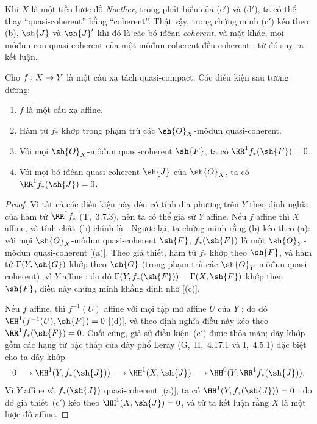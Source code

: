 \documentclass[oneside,10pt]{amsart}
\makeatletter
\newcommand{\ega@arrow}[2]{\mathchoice{#1}{#2}{#2}{#2}}
\renewcommand{\to}{\ega@arrow{\longrightarrow}{\rightarrow}}
\let\EGAOriginalLabel\label
\renewcommand{\label}[1]{\phantomsection\EGAOriginalLabel{#1}}
\makeatother
\begin{document}
\begin{remark}[5.2.1.1]
\label{II.5.2.1.1}
Khi $X$ là một tiền lược đồ \emph{Noether}, trong phát biểu của (c$'$) và (d$'$), ta có thể thay ``quasi-coherent'' bằng ``coherent''.
Thật vậy, trong chứng minh (c$'$) kéo theo (b), $\sh{J}$ và $\sh{J}'$ khi đó là các bó iđêan \emph{coherent}, và mặt khác, mọi môđun con quasi-coherent của một môđun coherent đều coherent ;
từ đó suy ra kết luận.
\end{remark}

\begin{corollary}[5.2.2]
\label{II.5.2.2}
Cho $f:X\to Y$ là một cấu xạ tách quasi-compact.
Các điều kiện sau tương đương:
\begin{enumerate}
  \item[{\rm(a)}] $f$ là một cấu xạ affine.
  \item[{\rm(b)}] Hàm tử $f_*$ khớp trong phạm trù các $\sh{O}_X$-môđun quasi-coherent.
  \item[{\rm(c)}] Với mọi $\sh{O}_X$-môđun quasi-coherent $\sh{F}$, ta có $\RR^1f_*(\sh{F})=0$.
  \item[{\rm(c')}] Với mọi bó iđêan quasi-coherent $\sh{J}$ của $\sh{O}_X$, ta có $\RR^1f_*(\sh{J})=0$.
\end{enumerate}
\end{corollary}

\begin{proof}
Vì tất cả các điều kiện này đều có tính địa phương trên $Y$ theo định nghĩa của hàm tử $\RR^1f_*$ (T,~3.7.3), nên ta có thể giả sử $Y$ affine.
Nếu $f$ affine thì $X$ affine, và tính chất~(b) chính là .
Ngược lại, ta chứng minh rằng (b) kéo theo (a):
với mọi $\sh{O}_X$-môđun quasi-coherent $\sh{F}$, $f_*(\sh{F})$ là một $\sh{O}_Y$-môđun quasi-coherent [(a)].
Theo giả thiết, hàm tử $f_*$ khớp theo $\sh{F}$, và hàm tử $\Gamma(Y,\sh{G})$ khớp theo $\sh{G}$ (trong phạm trù các $\sh{O}_Y$-môđun quasi-coherent), vì $Y$ affine ;
do đó $\Gamma(Y,f_*(\sh{F}))=\Gamma(X,\sh{F})$ khớp theo $\sh{F}$, điều này chứng minh khẳng định nhờ [(c)].

Nếu $f$ affine, thì $f^{-1}(U)$ affine với mọi tập mở affine $U$ của $Y$ ; do đó $\HH^1(f^{-1}(U),\sh{F})=0$ [(d)], và theo định nghĩa điều này kéo theo $\RR^1f_*(\sh{F})=0$.
Cuối cùng, giả sử điều kiện~(c$'$) được thỏa mãn;
dãy khớp gồm các hạng tử bậc thấp của dãy phổ Leray (G,~II,~4.17.1 và I,~4.5.1) đặc biệt cho ta dãy khớp
\[
  0\to\HH^1(Y,f_*(\sh{J}))\to\HH^1(X,\sh{J})\to\HH^0(Y,\RR^1f_*(\sh{J})).
\]
Vì $Y$ affine và $f_*(\sh{J})$ quasi-coherent [(a)], ta có $\HH^1(Y,f_*(\sh{J}))=0$ ;
do đó giả thiết~(c$'$) kéo theo $\HH^1(X,\sh{J})=0$, và từ  ta kết luận rằng $X$ là một lược đồ affine.
\end{proof}
\end{document}
